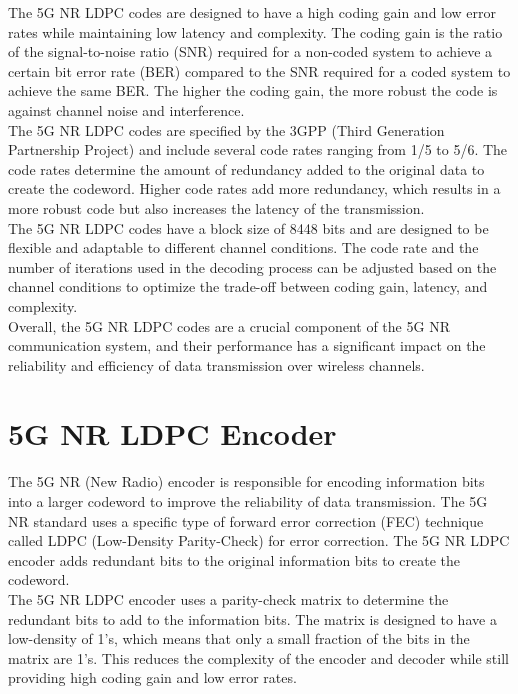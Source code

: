 \documentclass[journal,twocolumn]{IEEEtran}
\begin{document}
The 5G NR LDPC codes are designed to have a high coding gain and low error rates while maintaining low latency and complexity. The coding gain is the ratio of the signal-to-noise ratio (SNR) required for a non-coded system to achieve a certain bit error rate (BER) compared to the SNR required for a coded system to achieve the same BER. The higher the coding gain, the more robust the code is against channel noise and interference.\\

The 5G NR LDPC codes are specified by the 3GPP (Third Generation Partnership Project) and include several code rates ranging from 1/5 to 5/6. The code rates determine the amount of redundancy added to the original data to create the codeword. Higher code rates add more redundancy, which results in a more robust code but also increases the latency of the transmission.\\

The 5G NR LDPC codes have a block size of 8448 bits and are designed to be flexible and adaptable to different channel conditions. The code rate and the number of iterations used in the decoding process can be adjusted based on the channel conditions to optimize the trade-off between coding gain, latency, and complexity.\\

Overall, the 5G NR LDPC codes are a crucial component of the 5G NR communication system, and their performance has a significant impact on the reliability and efficiency of data transmission over wireless channels.
\section{\textbf{5G NR LDPC Encoder}}
The 5G NR (New Radio) encoder is responsible for encoding information bits into a larger codeword to improve the reliability of data transmission. The 5G NR standard uses a specific type of forward error correction (FEC) technique called LDPC (Low-Density Parity-Check) for error correction. The 5G NR LDPC encoder adds redundant bits to the original information bits to create the codeword.\\

The 5G NR LDPC encoder uses a parity-check matrix to determine the redundant bits to add to the information bits. The matrix is designed to have a low-density of 1's, which means that only a small fraction of the bits in the matrix are 1's. This reduces the complexity of the encoder and decoder while still providing high coding gain and low error rates.\\
\end{document}
